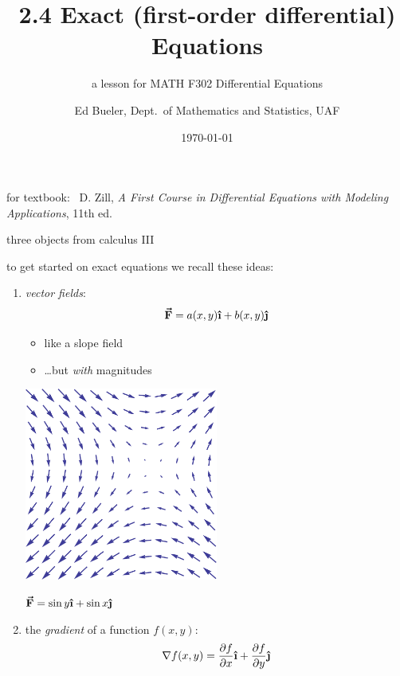 \documentclass{beamer}
\title{2.4 Exact (first-order differential) Equations}
\subtitle{a lesson for MATH F302 Differential Equations}
\author{Ed Bueler, Dept.~of Mathematics and Statistics, UAF}
\date{\tiny \today}
\newcommand{\grad}{\nabla}
\newcommand{\ih}{\boldsymbol{\hat{\textbf{\i}}}}
\newcommand{\jh}{\boldsymbol{\hat{\textbf{\j}}}}
\newcommand{\vF}{\boldsymbol{\vec{\textbf{F}}}}
\begin{document}

\begin{frame}
\titlepage

\centerline{\tiny for textbook: \, D. Zill, \emph{A First Course in Differential Equations with Modeling Applications}, 11th ed.}
\end{frame}


\begin{frame}{three objects from calculus III}

to get started on exact equations we recall these ideas:
\begin{enumerate}
\item \begin{minipage}[t]{0.4\textwidth}
\emph{vector fields}:
    $$\vF = a(x,y) \ih + b(x,y) \jh$$

\vspace{-3mm}
    \begin{itemize}
    \small
    \item like a slope field

    \vspace{-2mm}
    \item \dots but \emph{with} magnitudes
    \end{itemize}
\end{minipage}
\begin{minipage}[t]{0.5\textwidth}
\vspace{-2mm}

\hfill \includegraphics[width=0.5\textwidth]{figs/VectorField}

\hfill \tiny $\boldsymbol{\vec{\textbf{F}}} = \sin y \ih + \sin x \jh$
\end{minipage}

\vspace{-3mm}
\item the \emph{gradient} of a function $f(x,y)$:
    $$\grad f(x,y) = \frac{\partial f}{\partial x} \ih + \frac{\partial f}{\partial y} \jh$$


\end{enumerate}
\end{frame}
\end{document}

